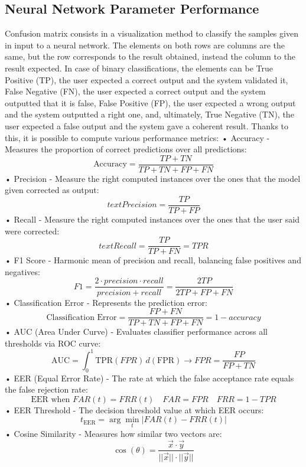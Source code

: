 \subsection{Neural Network Parameter Performance}
Confusion matrix consists in a visualization method to classify the samples given in input to a neural network. The elements on both rows are columns are the same, but the row corresponds to the result obtained, instead the column to the result expected. In case of binary classifications, the elements can be True Positive (TP), the user expected a correct output and the system validated it, False Negative (FN), the user expected a correct output and the system outputted that it is false, False Positive (FP), the user expected a wrong output and the system outputted a right one, and, ultimately, True Negative (TN), the user expected a false output and the system gave a coherent result. Thanks to this, it is possible to compute various performance metrics:\newline
• Accuracy - Measures the proportion of correct predictions over all predictions:\newline 
\[
\text{Accuracy} = \frac{TP + TN}{TP + TN + FP + FN}
\]
• Precision - Measure the right computed instances over the ones that the model given corrected as output:\newline
\[
text{Precision}=\frac{TP}{TP+FP}
\]
• Recall - Measure the right computed instances over the ones that the user said were corrected:\newline
\[
text{Recall}=\frac{TP}{TP+FN}=TPR
\]
• F1 Score - Harmonic mean of precision and recall, balancing false positives and negatives:\newline 
\[
F1 = \frac{2\cdot precision\cdot recall}{precision+recall}=\frac{2TP}{2TP + FP + FN}
\]
• Classification Error - Represents the prediction error:\newline
\[
\text{Classification Error} = \frac{FP + FN}{TP + TN + FP + FN}=1-accuracy
\]
• AUC (Area Under Curve) - Evaluates classifier performance across all thresholds via ROC curve: \newline 
\[
\text{AUC} = \int_{0}^{1} \text{TPR}(FPR) \, d(\text{FPR})\rightarrow FPR=\frac{FP}{FP+TN}
\]
• EER (Equal Error Rate) - The rate at which the false acceptance rate equals the false rejection rate:\newline
\[
\text{EER} \text{ when } FAR(t) = FRR(t)\,\,\,\,\,\,FAR=FPR\,\,\,\,\,\,FRR=1-TPR
\]
• EER Threshold - The decision threshold value at which EER occurs:\newline
\[
t_{\text{EER}} = \arg\min_t |FAR(t) - FRR(t)|
\]
• Cosine Similarity - Measures how similar two vectors are:\newline
\[
\cos(\theta) = \frac{\vec{x} \cdot \vec{y}}{||\vec{x}|| \cdot ||\vec{y}||}
\]

